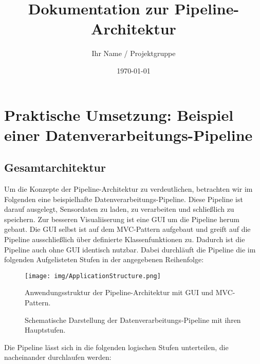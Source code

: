 \documentclass[a4paper]{article} %
\title{Dokumentation zur Pipeline-Architektur}
\author{Ihr Name / Projektgruppe}
\date{\today}
\begin{document}
\section{Praktische Umsetzung: Beispiel einer Datenverarbeitungs-Pipeline}
\subsection{Gesamtarchitektur}
Um die Konzepte der Pipeline-Architektur zu verdeutlichen, betrachten wir im Folgenden eine beispielhafte Datenverarbeitungs-Pipeline. Diese Pipeline ist darauf ausgelegt, Sensordaten zu laden, zu verarbeiten und schließlich zu speichern. Zur besseren Visualiiserung ist eine GUI um die Pipeline herum gebaut. Die GUI selbst ist auf dem MVC-Pattern aufgebaut und greift auf die Pipeline ausschließlich über definierte Klassenfunktionen zu. Dadurch ist die Pipeline auch ohne GUI identisch nutzbar. Dabei durchläuft die Pipeline die im folgenden Aufgelisteten Stufen in der angegebenen Reihenfolge:

\begin{figure}[htbp]
    \centering
    \texttt{[image: img/ApplicationStructure.png]}
    \caption{Anwendungsstruktur der Pipeline-Architektur mit GUI und MVC-Pattern.}
    \label{fig:application_structure}
\end{figure}

\begin{figure}[htbp] %
    \centering %
    \caption{Schematische Darstellung der Datenverarbeitungs-Pipeline mit ihren Hauptstufen.} %
    \label{fig:architektur} %
\end{figure}

Die Pipeline lässt sich in die folgenden logischen Stufen unterteilen, die nacheinander durchlaufen werden:
\end{document}
